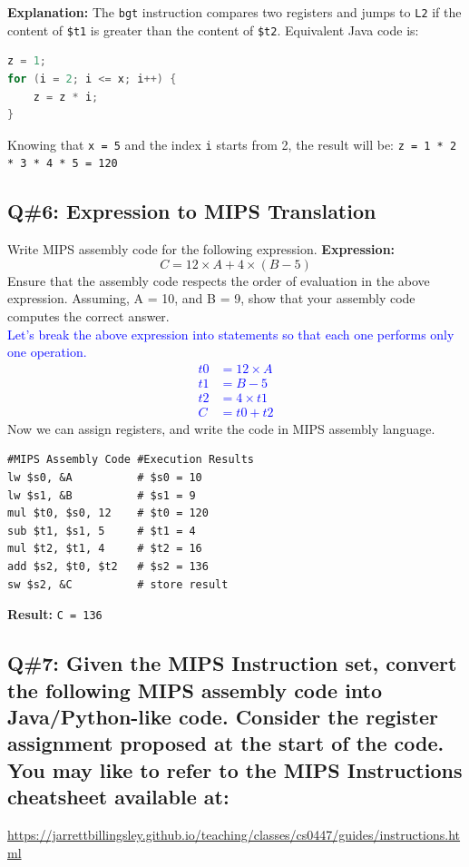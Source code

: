 \textbf{Explanation:}  
The \texttt{bgt} instruction compares two registers and jumps to \texttt{L2} if the content of \texttt{\$t1} is greater than the content of \texttt{\$t2}. Equivalent Java code is:

\begin{lstlisting}[language=Java]
z = 1;
for (i = 2; i <= x; i++) {
    z = z * i;
}
\end{lstlisting}

Knowing that \texttt{x = 5} and the index \texttt{i} starts from 2, the result will be:  
\texttt{z = 1 * 2 * 3 * 4 * 5 = 120}

\subsection*{Q\#6: Expression to MIPS Translation}
Write MIPS assembly code for the following expression.
\textbf{Expression:}  
\[
C = 12 \times A + 4 \times (B - 5)
\]
Ensure that the assembly code respects the order of evaluation in the above expression.
Assuming, A = 10, and B = 9, show that your assembly code computes the correct answer. \\
\textcolor{blue}{
Let’s break the above expression into statements so that each one performs only one operation.
\begin{align*}
t0 &= 12 \times A \\
t1 &= B - 5 \\
t2 &= 4 \times t1 \\
C &= t0 + t2
\end{align*}
}
Now we can assign registers, and write the code in MIPS assembly language.
\begin{lstlisting}
#MIPS Assembly Code #Execution Results
lw $s0, &A          # $s0 = 10
lw $s1, &B          # $s1 = 9
mul $t0, $s0, 12    # $t0 = 120
sub $t1, $s1, 5     # $t1 = 4
mul $t2, $t1, 4     # $t2 = 16
add $s2, $t0, $t2   # $s2 = 136
sw $s2, &C          # store result
\end{lstlisting}

\textbf{Result:} \texttt{C = 136}

\subsection{Q\#7: Given the MIPS Instruction set, convert the following MIPS assembly code into
Java/Python-like code. Consider the register assignment proposed at the start of the code.
You may like to refer to the MIPS Instructions cheatsheet available at: }
\url{https://jarrettbillingsley.github.io/teaching/classes/cs0447/guides/instructions.html}

